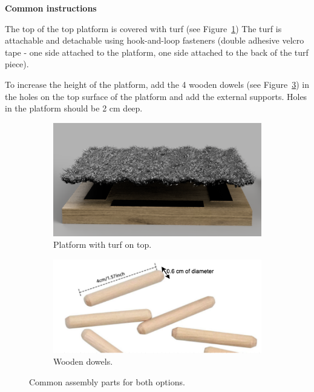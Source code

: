 {\bigskip

{\bfseries Common instructions}

\headlinebox

The top of the top platform is covered with turf
(see Figure~\ref{fig:parkour-top-turf})
The turf is attachable and detachable using hook-and-loop fasteners
(double adhesive velcro tape - one side attached to the platform,
one side attached to the back of the turf piece). 

To increase the height of the platform,
add the 4 wooden dowels (see Figure~\ref{fig:parkour-wooden-dowels})
in the holes on the top surface of the platform and add the external supports.
Holes in the platform should be 2 cm deep.

\begin{figure}[htb]
  \begin{subfigure}{.45\textwidth}
    \centering
    \includegraphics[width=\textwidth]{img/parkour/top_turf}
    \caption{Platform with turf on top.}
    \label{fig:parkour-top-turf}
  \end{subfigure}
  \hfill
  \begin{subfigure}{.45\textwidth}
    \centering
    \includegraphics[width=\textwidth]{img/parkour/wooden_dowels}
    \caption{Wooden dowels.}
    \label{fig:parkour-wooden-dowels}
  \end{subfigure}
  \caption{Common assembly parts for both options.}
\end{figure}

}
